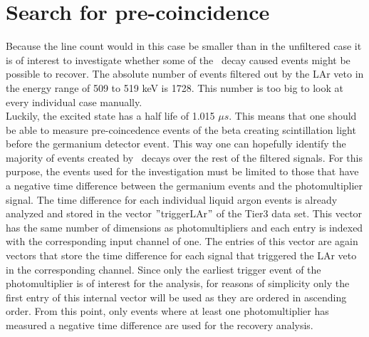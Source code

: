 \fi
























\section{Search for pre-coincidence}
\label{sec:precoince}

Because the line count would in this case be smaller than in the unfiltered case it is of interest to investigate whether some of the \Kr\ decay caused events might be possible to recover.
The absolute number of events filtered out by the LAr veto in the energy range of 509 to 519 keV is 1728.
This number is too big to look at every individual case manually.
\\

Luckily, the excited  state has a half life of 1.015 \(\unit{\mu s}\).
This means that one should be able to measure pre-coincedence events of the beta creating scintillation light before the germanium detector event.
This way one can hopefully identify the majority of events created by \Kr\ decays over the rest of the filtered signals.
For this purpose, the events used for the investigation must be limited to those that have a negative time difference between the germanium events and the photomultiplier signal.
The time difference for each individual liquid argon events is already analyzed and stored in the vector $"$triggerLAr$"$ of the Tier3 data set.
This vector has the same number of dimensions as photomultipliers and each entry is indexed with the corresponding input channel of one.
The entries of this vector are again vectors that store the time difference for each signal that triggered the LAr veto in the corresponding channel.
Since only the earliest trigger event of the photomultiplier is of interest for the analysis,  for reasons of simplicity only the first entry of this internal vector will be used as they are ordered in ascending order.
From this point, only events where at least one photomultiplier has measured a negative time difference are used for the recovery analysis.
\\

